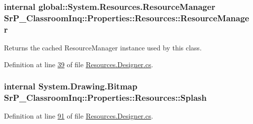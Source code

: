 \hypertarget{class_sr_p___classroom_inq_1_1_properties_1_1_resources_a7809b92866e9561f253e4829dc02560f}{
\subsubsection[{\-Resource\-Manager}]{\setlength{\rightskip}{0pt plus 5cm}internal global\-::\-System.\-Resources.\-Resource\-Manager \-Sr\-P\-\_\-\-Classroom\-Inq\-::\-Properties\-::\-Resources\-::\-Resource\-Manager}}
\label{class_sr_p___classroom_inq_1_1_properties_1_1_resources_a7809b92866e9561f253e4829dc02560f}


\-Returns the cached \-Resource\-Manager instance used by this class. 



\-Definition at line \hyperlink{_resources_8_designer_8cs_source_l00039}{39} of file \hyperlink{_resources_8_designer_8cs_source}{\-Resources.\-Designer.\-cs}.

\hypertarget{class_sr_p___classroom_inq_1_1_properties_1_1_resources_a75b49c74ef8386ce82d421d246095e89}{
\subsubsection[{\-Splash}]{\setlength{\rightskip}{0pt plus 5cm}internal \-System.\-Drawing.\-Bitmap \-Sr\-P\-\_\-\-Classroom\-Inq\-::\-Properties\-::\-Resources\-::\-Splash}}
\label{class_sr_p___classroom_inq_1_1_properties_1_1_resources_a75b49c74ef8386ce82d421d246095e89}


\-Definition at line \hyperlink{_resources_8_designer_8cs_source_l00091}{91} of file \hyperlink{_resources_8_designer_8cs_source}{\-Resources.\-Designer.\-cs}.

